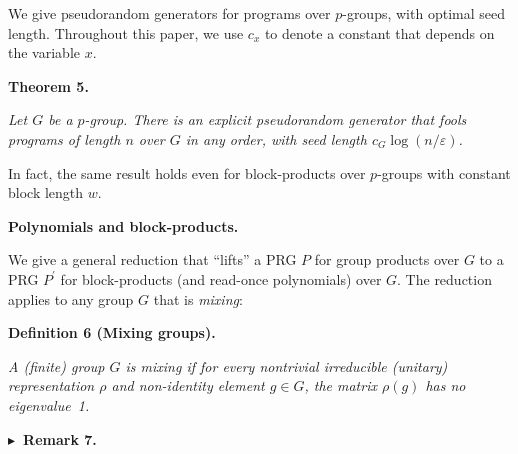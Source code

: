 \documentclass[10pt,a4paper]{article}
\begin{document}
We give pseudorandom generators for programs over $p$-groups, with
optimal seed length. Throughout this paper, we use $c_{x}$ to denote a constant that depends on the variable $x$.\par





\par\medskip\noindent\textbf{
\textbf{Theorem 5}\textbf{.}
}\par



\emph{Let $G$ be a $p$-group. There is an
explicit pseudorandom generator that fools programs of length $n$
over $G$ in any order, with seed length $c_{G}\log(n/\varepsilon)$.}\par






In fact, the same result holds even for block-products over $p$-groups
with constant block length $w$.\par




\par\medskip\noindent\textbf{Polynomials and block-products.}\par




We give a general reduction that “lifts” a PRG $P$ for group
products over $G$ to a PRG $P^{\prime}$ for block-products (and read-once
polynomials) over $G$. The reduction applies to any group $G$ that is \emph{mixing}:\par





\par\medskip\noindent\textbf{
\textbf{Definition 6}\textbf{ }(Mixing groups)\textbf{.}
}\par



\emph{A (finite) group $G$ is mixing if for every nontrivial irreducible (unitary) representation $\rho$ and non-identity element $g\in G$, the matrix $\rho(g)$ has no eigenvalue 1.}\par







\par\medskip\noindent\textbf{
$\blacktriangleright$ Remark 7.
}\par
\end{document}
